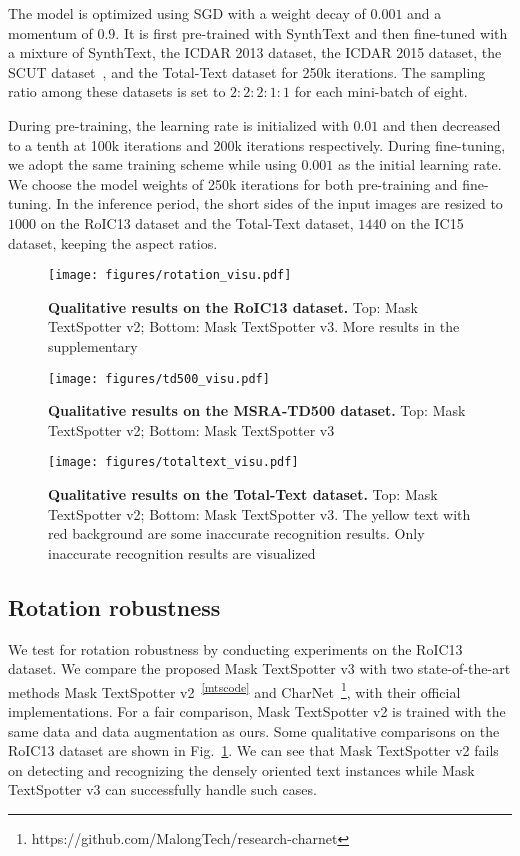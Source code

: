 \documentclass[runningheads]{llncs}
\begin{document}
The model is optimized using SGD with a weight decay of $0.001$ and a momentum of $0.9$. It is first pre-trained with SynthText and then fine-tuned with a mixture of SynthText, the ICDAR 2013 dataset, the ICDAR 2015 dataset, the SCUT dataset~\cite{zhong2016deeptext}, and the Total-Text dataset for 250k iterations. The sampling ratio among these datasets is set to $2:2:2:1:1$ for each mini-batch of eight. 


During pre-training, the learning rate is initialized with $0.01$ and then decreased to a tenth at 100k iterations and 200k iterations respectively. During fine-tuning, we adopt the same training scheme while using $0.001$ as the initial learning rate. We choose the model weights of 250k iterations for both pre-training and fine-tuning.
In the inference period, the short sides of the input images are resized to $1000$ on the RoIC13 dataset and the Total-Text dataset, $1440$ on the IC15 dataset, keeping the aspect ratios.

\begin{figure}[ht]
    \centering
    \texttt{[image: figures/rotation\_visu.pdf]}
    \caption{\textbf{Qualitative results on the RoIC13 dataset.} Top: Mask TextSpotter v2; Bottom: Mask TextSpotter v3. More results in the supplementary}
    \label{fig:rotation-visu}
\end{figure}

\begin{figure}[ht]
    \centering
    \texttt{[image: figures/td500\_visu.pdf]}
    \caption{\textbf{Qualitative results on the MSRA-TD500 dataset.} Top: Mask TextSpotter v2; Bottom: Mask TextSpotter v3}
    \label{fig:td500_visu}
\end{figure}

\begin{figure}[ht]
    \centering
    \texttt{[image: figures/totaltext\_visu.pdf]}
    \caption{\textbf{Qualitative results on the Total-Text dataset.} Top: Mask TextSpotter v2; Bottom: Mask TextSpotter v3. The yellow text with red background are some inaccurate recognition results. Only inaccurate recognition results are visualized}
    \label{fig:shape_visu}
\end{figure}

\subsection{Rotation robustness}
We test for rotation robustness by conducting experiments on the RoIC13 dataset. We compare the proposed Mask TextSpotter v3 with two state-of-the-art methods Mask TextSpotter v2~\textsuperscript{\ref{mtscode}} and CharNet~\footnote{https://github.com/MalongTech/research-charnet}, with their official implementations. For a fair comparison, Mask TextSpotter v2 is trained with the same data and data augmentation as ours. Some qualitative comparisons on the RoIC13 dataset are shown in Fig.~\ref{fig:rotation-visu}. We can see that Mask TextSpotter v2 fails on detecting and recognizing the densely oriented text instances while Mask TextSpotter v3 can successfully handle such cases.
\end{document}
